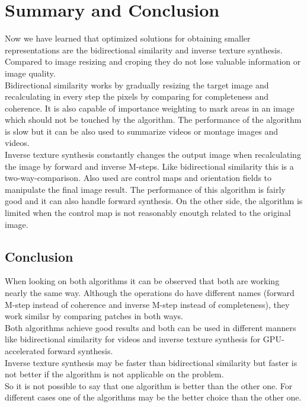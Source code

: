 \section{Summary and Conclusion}
Now we have learned that optimized solutions for obtaining smaller representations are the bidirectional similarity and inverse texture synthesis. Compared to image resizing and croping they do not lose valuable information or image quality.\\
Bidirectional similarity works by gradually resizing the target image and recalculating in every step the pixels by comparing for completeness and coherence. It is also capable of importance weighting to mark areas in an image which should not be touched by the algorithm. The performance of the algorithm is slow but it can be also used to summarize videos or montage images and videos.\\
Inverse texture synthesis constantly changes the output image when recalculating the image by forward and inverse M-steps. Like bidirectional similarity this is a two-way-comparison. Also used are control maps and orientation fields to manipulate the final image result. The performance of this algorithm is fairly good and it can also handle forward synthesis. On the other side, the algorithm is limited when the control map is not reasonably enoutgh  related to the original image.

\subsection*{Conclusion}
When looking on both algorithms it can be observed that both are working nearly the same way. Although the operations do have different names (forward M-step instead of coherence and inverse M-step instead of completeness), they work similar by comparing patches in both ways.\\
Both algorithms achieve good results and both can be used in different manners like bidirectional similarity for videos and inverse texture synthesis for GPU-accelerated forward synthesis.\\
Inverse texture synthesis may be faster than bidirectional similarity but faster is not better if the algorithm is not applicable on the problem.\\
So it is not possible to say that one algorithm is better than the other one. For different cases one of the algorithms may be the better choice than the other one.